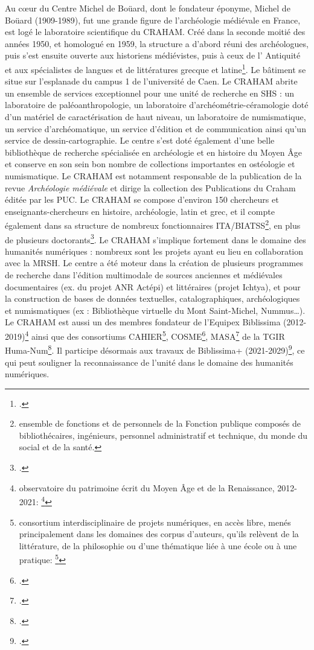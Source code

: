 \documentclass[a4paper,12pt,twoside]{book}
\begin{document}
    Au c\oe{}ur du Centre Michel de Boüard, dont le fondateur éponyme, Michel de Boüard (1909-1989), fut une grande figure de l'archéologie médiévale en France, est logé le laboratoire scientifique du CRAHAM. Créé dans la seconde moitié des années 1950, et homologué en 1959, la structure a d'abord réuni des archéologues, puis s'est ensuite ouverte aux historiens médiévistes, puis à ceux de l' Antiquité et aux spécialistes de langues et de littératures grecque et latine\footcite{craham}. Le bâtiment se situe sur l'esplanade du campus 1 de l'université de Caen. Le \acrshort{CRAHAM} abrite un ensemble de services exceptionnel pour une unité de recherche en \acrshort{SHS} : un laboratoire de paléoanthropologie, un laboratoire d'archéométrie-céramologie doté d'un matériel de caractérisation de haut niveau, un laboratoire de numismatique, un service d'archéomatique, un service d'édition et de communication ainsi qu'un service de dessin-cartographie. Le centre s'est doté également d'une belle bibliothèque de recherche spécialisée en archéologie et en histoire du Moyen Âge et conserve en son sein bon nombre de collections importantes en ostéologie et numismatique. Le \acrshort{CRAHAM} est notamment responsable de la publication de la revue \textit{Archéologie médiévale} et dirige la collection des \og Publications du Craham\fg{} éditée par les \acrlong{PUC}. Le \acrshort{CRAHAM} se compose d'environ 150 chercheurs et enseignants-chercheurs en histoire, archéologie, latin et grec, et il compte également dans sa structure de nombreux fonctionnaires ITA/BIATSS\footnote{ensemble de fonctions et de personnels de la Fonction publique composés de bibliothécaires, ingénieurs, personnel administratif et technique, du monde du social et de la santé.}, en plus de plusieurs doctorants\footcite{craham}.
    Le \acrshort{CRAHAM} s'implique fortement dans le domaine des humanités numériques : nombreux sont les projets ayant eu lieu en collaboration avec la \acrshort{MRSH}. Le centre a été moteur dans la création de \og plusieurs programmes de recherche dans l'édition multimodale de sources anciennes et médiévales documentaires (ex. du projet ANR Actépi) et littéraires (projet Ichtya), et pour la construction de bases de données textuelles, catalographiques, archéologiques et numismatiques (ex : Bibliothèque virtuelle du Mont Saint-Michel, Nummus…)\fg. Le \acrshort{CRAHAM} est aussi un des membres fondateur de l'Equipex Biblissima (2012-2019)\footnote{observatoire du patrimoine écrit du Moyen Âge et de la Renaissance, 2012-2021: \footcite{Biblissima}} ainsi que des consortiums CAHIER\footnote{consortium interdisciplinaire de projets numériques, en accès libre, menés principalement dans les domaines des \og corpus d'auteurs\fg, qu'ils relèvent de la littérature, de la philosophie ou d'une thématique liée à une école ou à une pratique: \footcite{consortium_cahier}}, COSME\footcite{consortium-cosme}, MASA\footcite{consortium-masa} de la \acrfull{TGIR} Huma-Num\footcite{huma-num}. Il participe désormais aux travaux de Biblissima+ (2021-2029)\footcite{Biblissima+}, ce qui peut souligner la reconnaissance de l'unité dans le domaine des humanités numériques.
    
\end{document}
